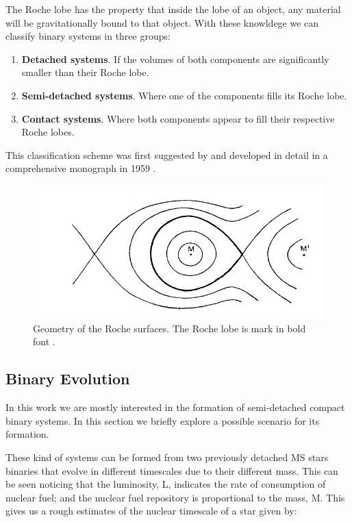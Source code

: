 The Roche lobe has the property that inside the lobe of an object, any material will be gravitationally bound to that object. With these knowldege we can classify binary systems in three groups:

\begin{enumerate}
        \item \textbf{Detached systems}. If the volumes of both components are significantly smaller than their Roche lobe. 
        \item \textbf{Semi-detached systems}. Where one of the components fills its Roche lobe.
        \item \textbf{Contact systems}. Where both components appear to fill their respective Roche lobes. 
\end{enumerate}

This classification scheme was first suggested by \citep{kopal_classification_1955} and developed in detail in a comprehensive monograph in 1959 \citep{kopal_close_1959}. 

\begin{figure}[]
        \centering
\includegraphics[scale=.3]{assets/images/kopalroche.png}
\caption{Geometry of the Roche surfaces. The Roche lobe is mark in bold font \citep{kopal_close_1959}.}
\label{fig:roche}
\end{figure}



\subsection{Binary Evolution}

In this work we are mostly interested in the formation of semi-detached compact binary systems. In this section we briefly explore a possible scenario for its formation. 

These kind of systems can be formed from two previously detached MS stars binaries that evolve in different timescales due to their different mass. This can be seen noticing that the luminosity, L, indicates the rate of consumption of nuclear fuel; and the nuclear fuel repository is proportional to the mass, M. This gives us a rough estimates of the nuclear timescale of a star given by:

